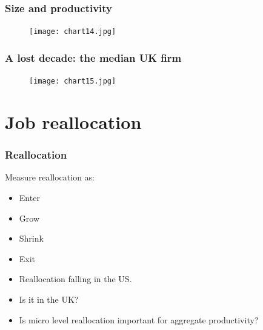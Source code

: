 \documentclass{beamer}
\begin{document}
\begin{frame}
\frametitle{Size and productivity}


\begin{figure}
\centering
\texttt{[image: chart14.jpg]}
\end{figure}

\end{frame}


\begin{frame}
\frametitle{A lost decade: the median UK firm}


\begin{figure}
\centering
\texttt{[image: chart15.jpg]}
\end{figure}

\end{frame}






\section{Job reallocation}


\begin{frame}
\frametitle{Reallocation}

Measure reallocation as:

\begin{itemize}
\item Enter
\item Grow
\item Shrink
\item Exit
\end{itemize}

\begin{itemize}
\item Reallocation falling in the US.
\item Is it in the UK?
\item Is micro level reallocation important for aggregate productivity?

\end{itemize}

\end{frame}
\end{document}
